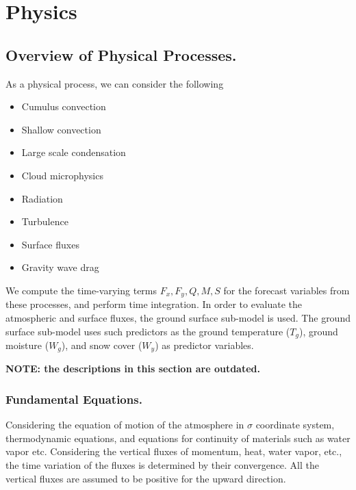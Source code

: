 \hypertarget{physics}{%
\section{Physics}\label{physics}}

\hypertarget{overview-of-physical-processes.}{%
\subsection{Overview of Physical
Processes.}\label{overview-of-physical-processes.}}

As a physical process, we can consider the following

\begin{itemize}
\tightlist
\item
  Cumulus convection
\item
  Shallow convection
\item
  Large scale condensation
\item
  Cloud microphysics
\item
  Radiation
\item
  Turbulence
\item
  Surface fluxes
\item
  Gravity wave drag
\end{itemize}

We compute the time-varying terms \(F_x, F_y, Q, M, S\) for the forecast
variables from these processes, and perform time integration. In order
to evaluate the atmospheric and surface fluxes, the ground surface
sub-model is used. The ground surface sub-model uses such predictors as
the ground temperature (\(T_g\)), ground moisture (\(W_g\)), and snow
cover (\(W_y\)) as predictor variables.

\textbf{NOTE: the descriptions in this section are outdated.}

\hypertarget{fundamental-equations.}{%
\subsubsection{Fundamental Equations.}\label{fundamental-equations.}}

Considering the equation of motion of the atmosphere in \(\sigma\)
coordinate system, thermodynamic equations, and equations for continuity
of materials such as water vapor etc. Considering the vertical fluxes of
momentum, heat, water vapor, etc., the time variation of the fluxes is
determined by their convergence. All the vertical fluxes are assumed to
be positive for the upward direction.

